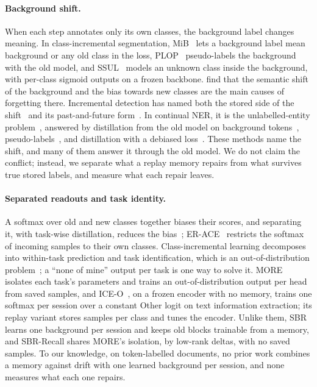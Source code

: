 \documentclass[10pt,twocolumn,letterpaper]{article}
\begin{document}
\paragraph{Background shift.} When each step annotates only its own classes, the background label changes meaning. In class-incremental segmentation, MiB~\citep{cermelli2020mib} lets a background label mean background or any old class in the loss, PLOP~\citep{douillard2021plop} pseudo-labels the background with the old model, and SSUL~\citep{cha2021ssul} models an unknown class inside the background, with per-class sigmoid outputs on a frozen backbone. \citet{kalb2022causes} find that the semantic shift of the background and the bias towards new classes are the main causes of forgetting there. Incremental detection has named both the stored side of the shift~\citep{liu2023abr} and its past-and-future form~\citep{mo2024bpf}. In continual NER, it is the unlabelled-entity problem~\citep{ma2023learning}, answered by distillation from the old model on background tokens~\citep{monaikul2021extendner,zheng2022cfner}, pseudo-labels~\citep{zhang2023cpfd}, and distillation with a debiased loss~\citep{qiu2024is3}. These methods name the shift, and many of them answer it through the old model. We do not claim the conflict; instead, we separate what a replay memory repairs from what survives true stored labels, and measure what each repair leaves.

\paragraph{Separated readouts and task identity.} A softmax over old and new classes together biases their scores, and separating it, with task-wise distillation, reduces the bias~\citep{ahn2021ssil}; ER-ACE~\citep{caccia2022erace} restricts the softmax of incoming samples to their own classes. Class-incremental learning decomposes into within-task prediction and task identification, which is an out-of-distribution problem~\citep{kim2022theoretical}; a ``none of mine'' output per task is one way to solve it. MORE~\citep{kim2022more} isolates each task's parameters and trains an out-of-distribution output per head from saved samples, and ICE-O~\citep{liu2023ice}, on a frozen encoder with no memory, trains one softmax per session over a constant Other logit on text information extraction; its replay variant stores samples per class and tunes the encoder. Unlike them, SBR learns one background per session and keeps old blocks trainable from a memory, and SBR-Recall shares MORE's isolation, by low-rank deltas, with no saved samples. To our knowledge, on token-labelled documents, no prior work combines a memory against drift with one learned background per session, and none measures what each one repairs.
\end{document}
